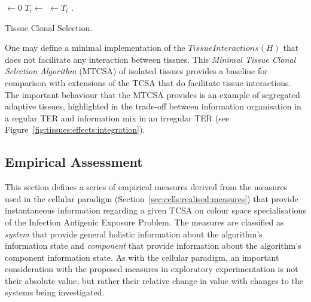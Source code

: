 \begin{algorithm}[ht]
  \SetLine
  
	\KwOut{\Host}
	
	\Host $\leftarrow$0\;
	{
		$T_i \leftarrow$ \CreateTissue{}\;
		\Host $\leftarrow T_i$\;		
	}
	\While{$\neg$\StopCondition{}}
	{
		\Habitat.\Exposure{\Host}\;
		\TissueInteractions{\Host}\;
	}
	\Return{\Host}\;
	\caption{Tissue Clonal Selection.}
	\label{alg:tissues:algorithms:tcsa}
\end{algorithm}

One may define a minimal implementation of the $TissueInteractions(H)$ that does not facilitate any interaction between tissues. This \emph{Minimal Tissue Clonal Selection Algorithm} (MTCSA) of isolated tissues provides a baseline for comparison with extensions of the TCSA that do facilitate tissue interactions. The important behaviour that the MTCSA provides is an example of segregated adaptive tissues, highlighted in the trade-off between information organisation in a regular TER and information mix in an irregular TER (see Figure~\ref{fig:tissues:effects:integration}).

%
%
\subsection{Empirical Assessment}
\label{subsec:tissues:paradigm:method:measures}
This section defines a series of empirical measures derived from the measures used in the cellular paradigm (Section~\ref{sec:cells:realised:measures}) that provide instantaneous information regarding a given TCSA on colour space specialisations of the Infection Antigenic Exposure Problem. The measures are classified as \emph{system} that provide general holistic information about the algorithm's information state and \emph{component} that provide information about the algorithm's component information state.
As with the cellular paradigm, an important consideration with the proposed measures in exploratory experimentation is not their absolute value, but rather their relative change in value with changes to the systems being investigated.


